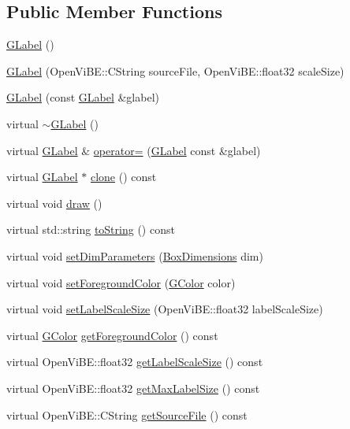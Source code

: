 \subsection*{Public Member Functions}
\begin{DoxyCompactItemize}
\item 
\hyperlink{classOpenViBEApplications_1_1GLabel_a9e58f15f13ad16e82b181a81fb36d23c}{GLabel} ()
\item 
\hyperlink{classOpenViBEApplications_1_1GLabel_abdeb815804d7cfb96c6cff70d08087b6}{GLabel} (OpenViBE::CString sourceFile, OpenViBE::float32 scaleSize)
\item 
\hyperlink{classOpenViBEApplications_1_1GLabel_adf202f59b51ee1ca01ec3364555d8169}{GLabel} (const \hyperlink{classOpenViBEApplications_1_1GLabel}{GLabel} \&glabel)
\item 
virtual \hyperlink{classOpenViBEApplications_1_1GLabel_ab3b709c3eb0cf21f1093d6d7e88b52dc}{$\sim$GLabel} ()
\item 
virtual \hyperlink{classOpenViBEApplications_1_1GLabel}{GLabel} \& \hyperlink{classOpenViBEApplications_1_1GLabel_a19c484642410f86e0ef1aaadf11fb250}{operator=} (\hyperlink{classOpenViBEApplications_1_1GLabel}{GLabel} const \&glabel)
\item 
virtual \hyperlink{classOpenViBEApplications_1_1GLabel}{GLabel} $\ast$ \hyperlink{classOpenViBEApplications_1_1GLabel_aca9909e04e4852aa3185b22de50470fc}{clone} () const 
\item 
virtual void \hyperlink{classOpenViBEApplications_1_1GLabel_ac94194b56ef4517fd62d6a1f68661a18}{draw} ()
\item 
virtual std::string \hyperlink{classOpenViBEApplications_1_1GLabel_a562a8811832fa57cd0b5ae48467ed687}{toString} () const 
\item 
virtual void \hyperlink{classOpenViBEApplications_1_1GLabel_ad720a3ee7c141b7eaa25be2adf7a2256}{setDimParameters} (\hyperlink{structOpenViBEApplications_1_1__BoxDimensions}{BoxDimensions} dim)
\item 
virtual void \hyperlink{classOpenViBEApplications_1_1GLabel_a471756148e52ee99cc1695fb0d7ee61e}{setForegroundColor} (\hyperlink{structOpenViBEApplications_1_1GColor}{GColor} color)
\item 
virtual void \hyperlink{classOpenViBEApplications_1_1GLabel_af76eb672f94fad5d9a6f36876b5a59cf}{setLabelScaleSize} (OpenViBE::float32 labelScaleSize)
\item 
virtual \hyperlink{structOpenViBEApplications_1_1GColor}{GColor} \hyperlink{classOpenViBEApplications_1_1GLabel_a9430e8bfae29618f0450504daccd788a}{getForegroundColor} () const 
\item 
virtual OpenViBE::float32 \hyperlink{classOpenViBEApplications_1_1GLabel_a4eeac77c92e96ef55e01bb67b89a1095}{getLabelScaleSize} () const 
\item 
virtual OpenViBE::float32 \hyperlink{classOpenViBEApplications_1_1GLabel_a1403d33e160c5aa2b87a4ef055e3ca69}{getMaxLabelSize} () const 
\item 
virtual OpenViBE::CString \hyperlink{classOpenViBEApplications_1_1GLabel_a18082bf5890e4107a3ba938c8450165e}{getSourceFile} () const 
\end{DoxyCompactItemize}
